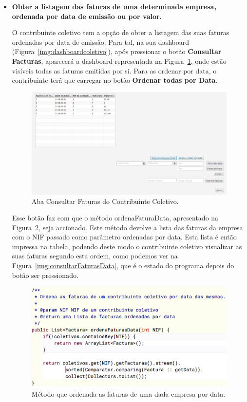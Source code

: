 \documentclass[a4paper]{article}
\begin{document}
\begin{itemize}
\item \textbf{Obter a listagem das faturas de uma determinada empresa, ordenada por data
de emissão ou por valor.}

O contribuinte coletivo tem a opção de obter a listagem das suas faturas
ordenadas por data de emissão. Para tal, na sua dashboard
(Figura~\ref{img:dashboardcoletivo}),
após pressionar o botão \textbf{Consultar Facturas}, aparecerá a dashboard representada na
Figura~\ref{img:consultarFaturas}, onde estão visíveis todas as faturas emitidas por si.
Para as ordenar por data, o contribuinte terá que carregar no botão \textbf{Ordenar todas por Data}.

\begin{figure}[H]
\centering
\includegraphics[scale=0.3]{imgs/consultarFaturas.png}
\caption{Aba Consultar Faturas do Contribuinte Coletivo.}
\label{img:consultarFaturas}
\end{figure}

Esse botão faz com que o método \textsf{ordenaFaturaData}, apresentado
na Figura~\ref{img:ordenaFaturaData}, seja accionado.
Este método devolve a lista das faturas da empresa com o NIF passado como
parâmetro ordenadas por data. Esta lista é então impressa na tabela,
podendo deste modo o contribuinte coletivo visualizar as suas faturas segundo esta ordem,
como podemos ver na Figura~\ref{img:consultarFaturasData}, que é o estado do programa
depois do botão ser pressionado.

\begin{figure}[H]
\centering
\includegraphics[scale=0.35]{imgs/ordenaFaturaData.png}
\caption{Método que ordenada as faturas de uma dada empresa por data.}
\label{img:ordenaFaturaData}
\end{figure}


\end{itemize}
\end{document}
